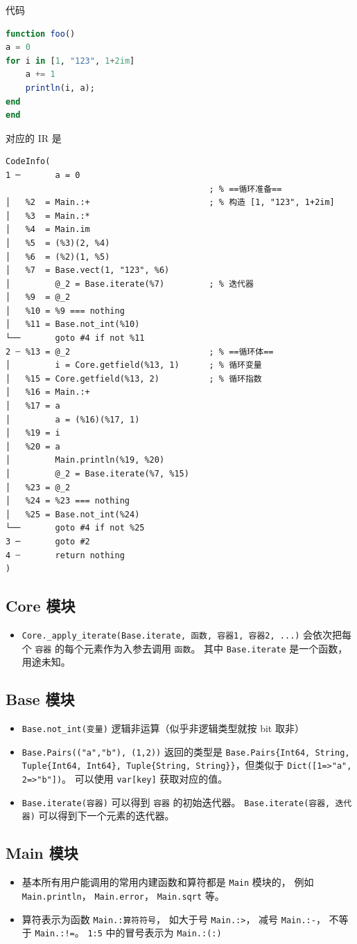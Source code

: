 代码
\begin{lstlisting}[language=julia]
function foo()
a = 0
for i in [1, "123", 1+2im]
    a += 1
    println(i, a);
end
end
\end{lstlisting}
对应的 IR 是
\begin{lstlisting}[language=none]
CodeInfo(
1 ─       a = 0
                                         ; % ==循环准备==
│   %2  = Main.:+                        ; % 构造 [1, "123", 1+2im]
│   %3  = Main.:*
│   %4  = Main.im
│   %5  = (%3)(2, %4)
│   %6  = (%2)(1, %5)
│   %7  = Base.vect(1, "123", %6)
│         @_2 = Base.iterate(%7)         ; % 迭代器
│   %9  = @_2
│   %10 = %9 === nothing
│   %11 = Base.not_int(%10)
└──       goto #4 if not %11
2 ┄ %13 = @_2                            ; % ==循环体==
│         i = Core.getfield(%13, 1)      ; % 循环变量
│   %15 = Core.getfield(%13, 2)          ; % 循环指数
│   %16 = Main.:+
│   %17 = a
│         a = (%16)(%17, 1)
│   %19 = i
│   %20 = a
│         Main.println(%19, %20)
│         @_2 = Base.iterate(%7, %15)
│   %23 = @_2
│   %24 = %23 === nothing
│   %25 = Base.not_int(%24)
└──       goto #4 if not %25
3 ─       goto #2
4 ┄       return nothing
)
\end{lstlisting}

\subsection{Core 模块}
\begin{itemize}
\item \verb`Core._apply_iterate(Base.iterate, 函数, 容器1, 容器2, ...)` 会依次把每个 \verb`容器` 的每个元素作为入参去调用 \verb`函数`。 其中 \verb`Base.iterate` 是一个函数，用途未知。
\end{itemize}

\subsection{Base 模块}
\begin{itemize}
\item \verb`Base.not_int(变量)` 逻辑非运算（似乎非逻辑类型就按 bit 取非）
\item \verb`Base.Pairs(("a","b"), (1,2))` 返回的类型是 \verb`Base.Pairs{Int64, String, Tuple{Int64, Int64}, Tuple{String, String}}`，但类似于 \verb`Dict([1=>"a", 2=>"b"])`。 可以使用 \verb`var[key]` 获取对应的值。
\item \verb`Base.iterate(容器)` 可以得到 \verb`容器` 的初始迭代器。 \verb`Base.iterate(容器, 迭代器)` 可以得到下一个元素的迭代器。
\end{itemize}

\subsection{Main 模块}

\begin{itemize}
\item 基本所有用户能调用的常用内建函数和算符都是 \verb`Main` 模块的， 例如 \verb`Main.println`， \verb`Main.error`， \verb`Main.sqrt` 等。
\item 算符表示为函数 \verb`Main.:算符符号`， 如大于号 \verb`Main.:>`， 减号 \verb`Main.:-`， 不等于 \verb`Main.:!=`。 \verb`1:5` 中的冒号表示为 \verb`Main.:(:)`
\end{itemize}
